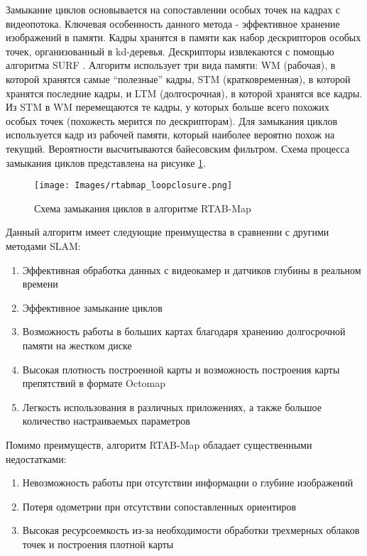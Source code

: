 \documentclass{mipt-thesis-bs}
\begin{document}
Замыкание циклов основывается на сопоставлении особых точек на кадрах с видеопотока. Ключевая особенность данного метода - эффективное хранение изображений в памяти. Кадры хранятся в памяти как набор дескрипторов особых точек, организованный в kd-деревья. Дескрипторы извлекаются с помощью алгоритма SURF \cite{bay2006surf}. Алгоритм использует три вида памяти: WM (рабочая), в которой хранятся самые “полезные” кадры, STM (кратковременная), в которой хранятся последние кадры, и LTM (долгосрочная), в которой хранятся все кадры. Из STM в WM перемещаются те кадры, у которых больше всего похожих особых точек (похожесть мерится по дескрипторам). Для замыкания циклов используется кадр из рабочей памяти, который наиболее вероятно похож на текущий. Вероятности высчитываются байесовским фильтром. Схема процесса замыкания циклов представлена на рисунке \ref{figureloopclosing}.

\begin{figure}
	\centering
	\texttt{[image: Images/rtabmap\_loopclosure.png]}
	\caption{Схема замыкания циклов в алгоритме RTAB-Map}
	\label{figureloopclosing}
\end{figure}

Данный алгоритм имеет следующие преимущества в сравнении с другими методами SLAM:
\begin{enumerate}
	\item {Эффективная обработка данных с видеокамер и датчиков глубины в реальном времени}
	\item {Эффективное замыкание циклов}
	\item {Возможность работы в больших картах благодаря хранению долгосрочной памяти на жестком диске}
	\item {Высокая плотность построенной карты и возможность построения карты препятствий в формате Octomap}
	\item {Легкость использования в различных приложениях, а также большое количество настраиваемых параметров}
\end{enumerate}
Помимо преимуществ, алгоритм RTAB-Map обладает существенными недостатками:
\begin{enumerate}
\item {Невозможность работы при отсутствии информации о глубине изображений}
\item {Потеря одометрии при отсутствии сопоставленных ориентиров}
\item {Высокая ресурсоемкость из-за необходимости обработки трехмерных облаков точек и построения плотной карты}
\end{enumerate}
\end{document}
